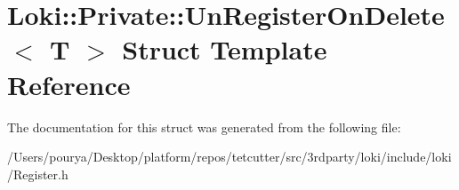 \hypertarget{structLoki_1_1Private_1_1UnRegisterOnDelete}{}\section{Loki\+:\+:Private\+:\+:Un\+Register\+On\+Delete$<$ T $>$ Struct Template Reference}
\label{structLoki_1_1Private_1_1UnRegisterOnDelete}


The documentation for this struct was generated from the following file\+:\begin{DoxyCompactItemize}
\item 
/\+Users/pourya/\+Desktop/platform/repos/tetcutter/src/3rdparty/loki/include/loki/Register.\+h\end{DoxyCompactItemize}
